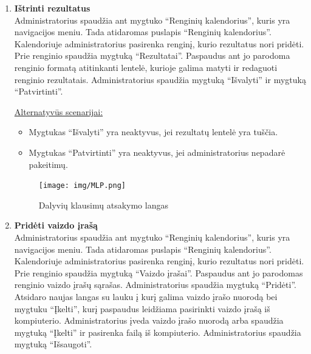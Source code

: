 \documentclass{VUMIFPSkursinis}
\begin{document}
\begin{enumerate} [label = \textbf{U\arabic*.}]
					\underline{Alternatyvūs scenarijai:}
					\begin{itemize}
						\item Metamos klaidos, jei rezultatai yra vedami neteisingai (pvz.: kai į skaitinius laukus bandomos įvesti raidės).
						\item Mygtukas “Patvirtinti” yra neaktyvus, jei administratorius nepadarė pakeitimų.
					\end{itemize}
				
				\begin{figure}[H]
					\centering
					\texttt{[image: img/MLP.png]}
					\caption{Dalyvių klausimų atsakymo langas}
					\label{fig:atsakyti-klausimus}
				\end{figure}
				
			\item \textbf{Ištrinti rezultatus}   \\
					Administratorius spaudžia ant mygtuko “Renginių kalendorius”, kuris yra navigacijos meniu. Tada atidaromas puslapis “Renginių kalendorius”. Kalendoriuje administratorius pasirenka renginį, kurio rezultatus nori pridėti. Prie renginio spaudžia mygtuką “Rezultatai”. Paspaudus ant jo parodoma renginio formatą atitinkanti lentelė, kurioje galima matyti ir redaguoti renginio rezultatais. Administratorius spaudžia mygtuką “Išvalyti” ir mygtuką “Patvirtinti”.
					
					\underline{Alternatyvūs scenarijai:}
					\begin{itemize}
						\item Mygtukas “Išvalyti” yra neaktyvus, jei rezultatų lentelė yra tuščia.
						\item Mygtukas “Patvirtinti” yra neaktyvus, jei administratorius nepadarė pakeitimų.
					\end{itemize}
				
				\begin{figure}[H]
					\centering
					\texttt{[image: img/MLP.png]}
					\caption{Dalyvių klausimų atsakymo langas}
					\label{fig:atsakyti-klausimus}
				\end{figure}
				
			\item \textbf{Pridėti vaizdo įrašą}   \\
					Administratorius spaudžia ant mygtuko “Renginių kalendorius”, kuris yra navigacijos meniu. Tada atidaromas puslapis “Renginių kalendorius”. Kalendoriuje administratorius pasirenka renginį, kurio rezultatus nori pridėti. Prie renginio spaudžia mygtuką “Vaizdo įrašai”. Paspaudus ant jo parodomas renginio vaizdo įrašų sąrašas. Administratorius spaudžia mygtuką “Pridėti”. Atsidaro naujas langas su lauku į kurį galima vaizdo įrašo nuorodą bei mygtuku “Įkelti”, kurį paspaudus leidžiama pasirinkti vaizdo įrašą iš kompiuterio. Administratorius įveda vaizdo įrašo nuorodą arba spaudžia mygtuką “Įkelti” ir pasirenka failą iš kompiuterio. Administratorius spaudžia mygtuką “Išsaugoti”.
					

\end{enumerate}
\end{document}
